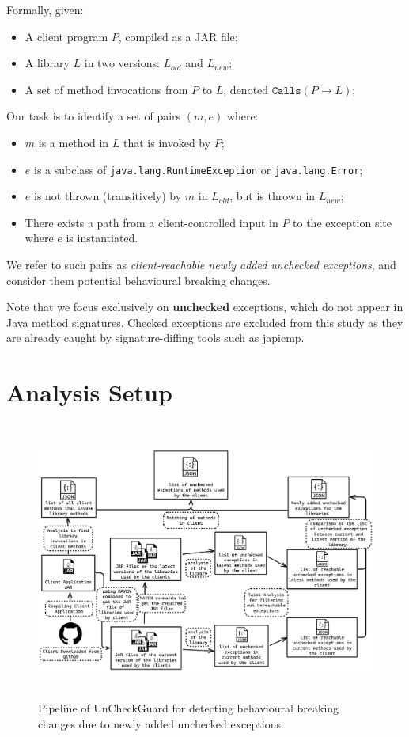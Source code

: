 Formally, given:
\begin{itemize}
  \item A client program $P$, compiled as a JAR file;
  \item A library $L$ in two versions: $L_{old}$ and $L_{new}$;
  \item A set of method invocations from $P$ to $L$, denoted $\texttt{Calls}(P \rightarrow L)$;
\end{itemize}

Our task is to identify a set of pairs $(m, e)$ where:
\begin{itemize}
  \item $m$ is a method in $L$ that is invoked by $P$;
  \item $e$ is a subclass of \texttt{java.lang.RuntimeException} or \texttt{java.lang.Error};
  \item $e$ is not thrown (transitively) by $m$ in $L_{old}$, but is thrown in $L_{new}$;
  \item There exists a path from a client-controlled input in $P$ to the exception site where $e$ is instantiated.
\end{itemize}

We refer to such pairs as \textit{client-reachable newly added unchecked exceptions}, and consider them potential behavioural breaking changes.

Note that we focus exclusively on \textbf{unchecked} exceptions, which do not appear in Java method signatures. Checked exceptions are excluded from this study as they are already caught by signature-diffing tools such as japicmp.

\section{Analysis Setup}

\begin{figure}[hbt!]
    \centering
    \includegraphics[height=260pt]{diagram/finalfpioeline.png}
    \caption{Pipeline of UnCheckGuard for detecting behavioural breaking changes due to newly added unchecked exceptions.}
    \label{fig:jsonjava}
\end{figure}

